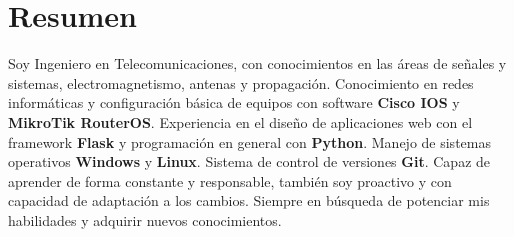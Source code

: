 \documentclass[espanol]{cv-style}     %
\begin{document}
\section{Resumen}
  \vspace{-0.2cm}
Soy Ingeniero en Telecomunicaciones, con conocimientos en las áreas de señales y sistemas, electromagnetismo, antenas y propagación. Conocimiento en redes informáticas y configuración básica de equipos con software \textbf{Cisco IOS} y \textbf{MikroTik RouterOS}. Experiencia en el diseño de aplicaciones web con el framework \textbf{Flask} y programación en general con \textbf{Python}. Manejo de sistemas operativos \textbf{Windows} y \textbf{Linux}. Sistema de control de versiones \textbf{Git}. Capaz de aprender de forma constante y responsable, también soy proactivo y con capacidad de adaptación a los cambios. Siempre en búsqueda de potenciar mis habilidades y adquirir nuevos conocimientos.
\end{document}
